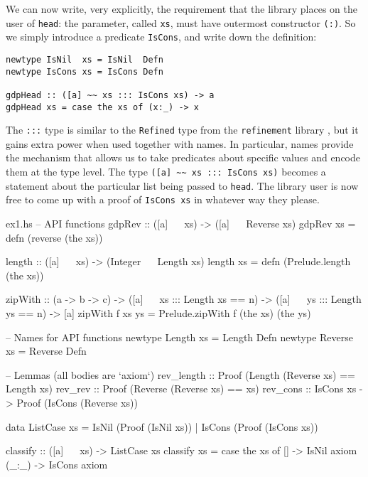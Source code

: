 \documentclass[format=sigplan, review=false, screen=true]{acmart}
\begin{document}
We can now write, very explicitly, the requirement that the library places on the user
of \texttt{head}: the parameter, called \texttt{xs}, must have outermost constructor
\texttt{(:)}. So we simply introduce a predicate \texttt{IsCons}, and write down the definition:
\begin{verbatim}
newtype IsNil  xs = IsNil  Defn
newtype IsCons xs = IsCons Defn

gdpHead :: ([a] ~~ xs ::: IsCons xs) -> a
gdpHead xs = case the xs of (x:_) -> x
\end{verbatim}
The \texttt{:::} type is similar to the \texttt{Refined} type from the \texttt{refinement} library \cite{refined},
but it gains extra power when used together with names.
In particular, names provide the mechanism that allows us to take predicates about specific values and
encode them at the type level.
The type \verb|([a] ~~ xs ::: IsCons xs)| becomes a statement about the particular list being passed to \texttt{head}.
The library user is now free to come up with a proof of \texttt{IsCons xs} in whatever way they please.


\begin{filecontents*}{ex1.hs}
-- API functions
gdpRev :: ([a] ~~ xs) -> ([a] ~~ Reverse xs)
gdpRev xs = defn (reverse (the xs))

length :: ([a] ~~ xs) -> (Integer ~~ Length xs)
length xs = defn (Prelude.length (the xs))

zipWith :: (a -> b -> c)
         -> ([a] ~~ xs ::: Length xs == n)
         -> ([a] ~~ ys ::: Length ys == n)
         -> [a]
zipWith f xs ys = Prelude.zipWith f (the xs) (the ys)

-- Names for API functions
newtype Length  xs = Length  Defn
newtype Reverse xs = Reverse Defn

-- Lemmas (all bodies are `axiom`)
rev_length :: Proof (Length (Reverse xs) == Length xs)
rev_rev    :: Proof (Reverse (Reverse xs) == xs)
rev_cons   :: IsCons xs -> Proof (IsCons (Reverse xs))

data ListCase xs = IsNil  (Proof (IsNil  xs))
                 | IsCons (Proof (IsCons xs)) 

classify :: ([a] ~~ xs) -> ListCase xs
classify xs = case the xs of
  []    -> IsNil  axiom
  (_:_) -> IsCons axiom
\end{filecontents*}

\end{document}
